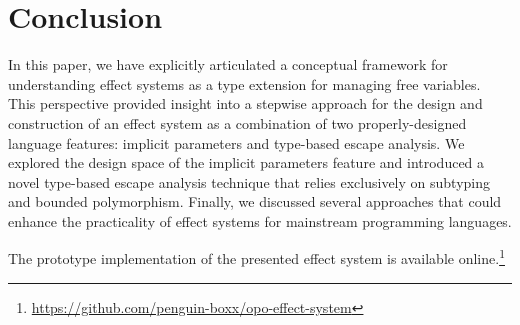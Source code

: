 \documentclass[acmsmall,review,screen]{acmart}
\begin{document}


\section{Conclusion} \label{sec:conclusion}

In this paper, we have explicitly articulated a conceptual framework for understanding effect systems as a type extension for managing free variables.
This perspective provided insight into a stepwise approach for the design and construction of an effect system as a combination of two properly-designed language features: implicit parameters and type-based escape analysis.
We explored the design space of the implicit parameters feature and introduced a novel type-based escape analysis technique that relies exclusively on subtyping and bounded polymorphism.
Finally, we discussed several approaches that could enhance the practicality of effect systems for mainstream programming languages.


The prototype implementation of the presented effect system is available online.\footnote{\url{https://github.com/penguin-boxx/opo-effect-system}}






\end{document}
